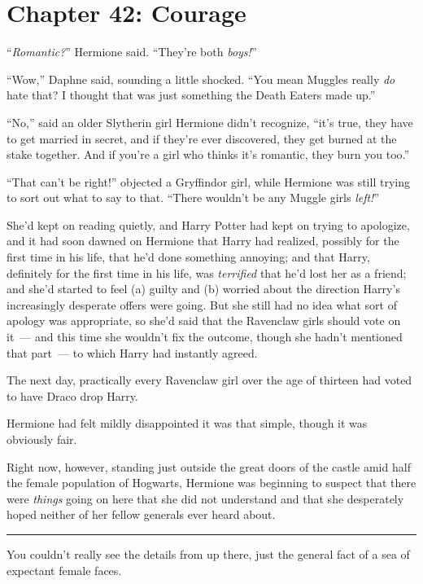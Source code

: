 \chapter{Chapter 42: Courage}
``\emph{Romantic?}'' Hermione said. ``They're both \emph{boys!}''

``Wow,'' Daphne said, sounding a little shocked. ``You mean Muggles really \emph{do} hate that? I thought that was just something the Death Eaters made up.''

``No,'' said an older Slytherin girl Hermione didn't recognize, ``it's true, they have to get married in secret, and if they're ever discovered, they get burned at the stake together. And if you're a girl who thinks it's romantic, they burn you too.''

``That can't be right!'' objected a Gryffindor girl, while Hermione was still trying to sort out what to say to that. ``There wouldn't be any Muggle girls \emph{left!}''

She'd kept on reading quietly, and Harry Potter had kept on trying to apologize, and it had soon dawned on Hermione that Harry had realized, possibly for the first time in his life, that he'd done something annoying; and that Harry, definitely for the first time in his life, was \emph{terrified} that he'd lost her as a friend; and she'd started to feel (a) guilty and (b) worried about the direction Harry's increasingly desperate offers were going. But she still had no idea what sort of apology was appropriate, so she'd said that the Ravenclaw girls should vote on it~--- and this time she wouldn't fix the outcome, though she hadn't mentioned that part~--- to which Harry had instantly agreed.

The next day, practically every Ravenclaw girl over the age of thirteen had voted to have Draco drop Harry.

Hermione had felt mildly disappointed it was that simple, though it was obviously fair.

Right now, however, standing just outside the great doors of the castle amid half the female population of Hogwarts, Hermione was beginning to suspect that there were \emph{things} going on here that she did not understand and that she desperately hoped neither of her fellow generals ever heard about.

\begin{center}\rule{3in}{0.4pt}\end{center}

You couldn't really see the details from up there, just the general fact of a sea of expectant female faces.

